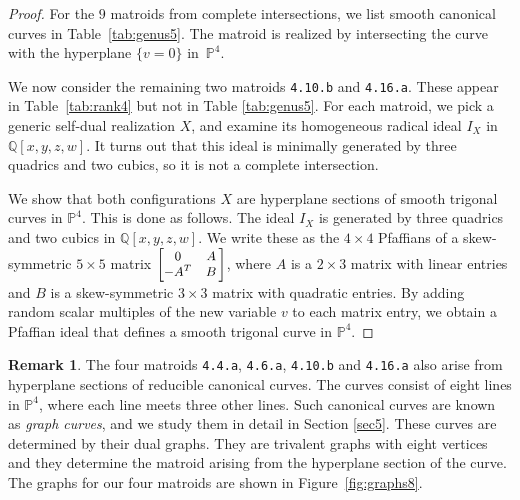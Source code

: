 \documentclass[12pt]{extarticle}
\theoremstyle{definition}
\newtheorem{remark}[theorem]{Remark}
\numberwithin{theorem}{section}
\theoremstyle{plain}\newtheorem{ithm}{Theorem}
\newcommand{\PP}{\mathbb{P}}
\newcommand{\QQ}{\mathbb{Q}}
\begin{document}
\begin{proof}
For the $9$ matroids from complete intersections, we list smooth canonical curves in Table~\ref{tab:genus5}. The matroid is realized by intersecting the curve with the hyperplane 
$ \{v {=} 0\}$ in~$\PP^4$.

We now consider the remaining two matroids \texttt{4.10.b} and \texttt{4.16.a}.
These appear in Table~\ref{tab:rank4} but not in Table \ref{tab:genus5}. For each matroid, we pick
a generic self-dual realization $X$, and examine its
homogeneous radical ideal $I_X$  in $\QQ[x,y,z,w]$. It turns out that
this ideal is minimally generated by three quadrics and two cubics,
so it is not a complete intersection. 

We show that both configurations $X$ are hyperplane sections of smooth trigonal curves in $\PP^4$.
This is done as follows. The ideal $I_X$ is generated by three quadrics and two cubics in
$\QQ[x,y,z,w]$. We write these as
the $4 \times 4$ Pfaffians of a skew-symmetric $5 \times 5$ matrix
$ \begin{small} \begin{bmatrix} 0 & A \,\\ - A^T & B\, \end{bmatrix}\end{small}$,
where $A$ is a $2 \times 3$ matrix with linear entries and
$B$ is a skew-symmetric $3 \times 3$ matrix with quadratic entries.
By adding random scalar multiples of the new variable $v$ to each matrix
entry, we obtain a Pfaffian ideal that defines a smooth
trigonal curve in $\PP^4$.
\end{proof}


\begin{remark} \label{rem:dreifuenf}
The four matroids  \texttt{4.4.a}, \texttt{4.6.a}, \texttt{4.10.b} and \texttt{4.16.a} also arise from hyperplane
sections of reducible canonical curves. 
The curves consist of
eight lines in $\PP^4$, where each line meets three other lines.
Such canonical  curves are known as {\em graph curves}, and we study them in detail in Section \ref{sec5}.
These curves are determined by their dual graphs. They are trivalent graphs with eight vertices and they determine the matroid arising from the hyperplane section of the curve.
The graphs for our four
matroids are shown in Figure~\ref{fig:graphs8}.
\end{remark}
\end{document}
